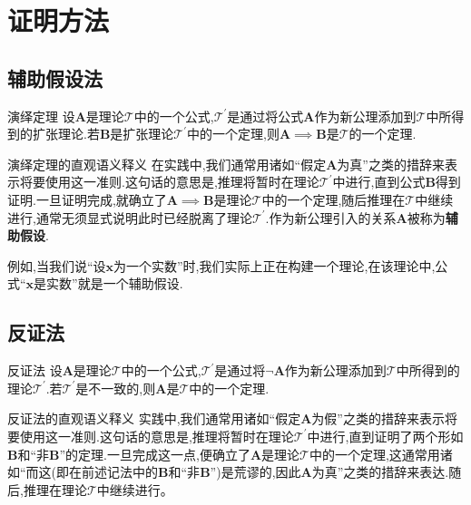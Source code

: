 \section{证明方法}

\subsection*{辅助假设法}

\begin{metatheorem}{演绎定理}{}
	设$\boldsymbol{A}$是理论$\mathcal{T}$中的一个公式,$\mathcal{T}^{\prime}$是通过将公式$\boldsymbol{A}$作为新公理添加到$\mathcal{T}$中所得到的扩张理论.若$\boldsymbol{B}$是扩张理论$\mathcal{T}^{\prime}$中的一个定理,则$\boldsymbol{A}\implies\boldsymbol{B}$是$\mathcal{T}$的一个定理.
\end{metatheorem}

\begin{remark}{演绎定理的直观语义释义}{}
	在实践中,我们通常用诸如``假定$\boldsymbol{A}$为真''之类的措辞来表示将要使用这一准则.这句话的意思是,推理将暂时在理论$\mathcal{T}^{\prime}$中进行,直到公式$\boldsymbol{B}$得到证明.一旦证明完成,就确立了$\boldsymbol{A}\implies\boldsymbol{B}$是理论$\mathcal{T}$中的一个定理,随后推理在$\mathcal{T}$中继续进行,通常无须显式说明此时已经脱离了理论$\mathcal{T}^{\prime}$.作为新公理引入的关系$\boldsymbol{A}$被称为\textbf{辅助假设}.
	
	例如,当我们说``设$\boldsymbol{x}$为一个实数''时,我们实际上正在构建一个理论,在该理论中,公式``$\boldsymbol{x}$是实数''就是一个辅助假设.
\end{remark}

\subsection*{反证法}

\begin{metatheorem}{反证法}{}
	设$\boldsymbol{A}$是理论$\mathcal{T}$中的一个公式,$\mathcal{T}^{\prime}$是通过将$\neg\boldsymbol{A}$作为新公理添加到$\mathcal{T}$中所得到的理论$\mathcal{T}^{\prime}$.若$\mathcal{T}^{\prime}$是不一致的,则$\boldsymbol{A}$是$\mathcal{T}$中的一个定理.
\end{metatheorem}

\begin{remark}{反证法的直观语义释义}{}
	实践中,我们通常用诸如``假定$\boldsymbol{A}$为假''之类的措辞来表示将要使用这一准则.这句话的意思是,推理将暂时在理论$\mathcal{T}^{\prime}$中进行,直到证明了两个形如$\boldsymbol{B}$和``非$\boldsymbol{B}$''的定理.一旦完成这一点,便确立了$\boldsymbol{A}$是理论$\mathcal{T}$中的一个定理,这通常用诸如``而这(即在前述记法中的$\boldsymbol{B}$和``非$\boldsymbol{B}$'')是荒谬的,因此$\boldsymbol{A}$为真''之类的措辞来表达.随后,推理在理论$\mathcal{T}$中继续进行。
\end{remark}

